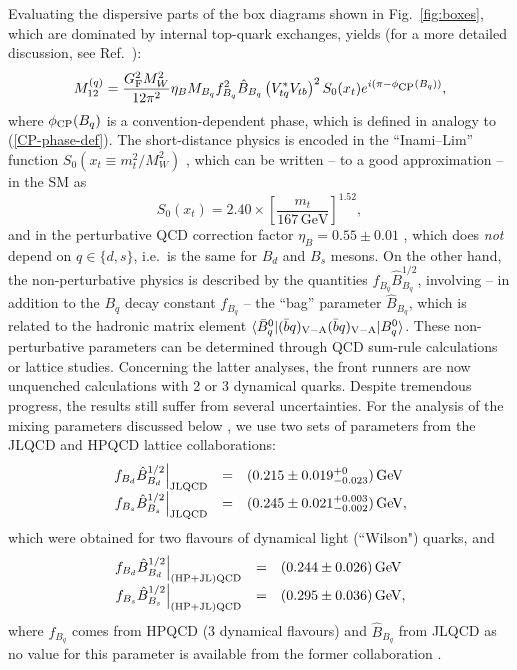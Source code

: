 \documentclass[12pt]{article}
\begin{document}
Evaluating the dispersive parts of the box diagrams shown in
Fig.~\ref{fig:boxes}, which are dominated by internal top-quark 
exchanges, yields (for a more detailed discussion, see Ref.~\cite{BF-rev}):
\begin{equation}\label{M12-calc}
M_{12}^{(q)}=
\frac{G_{\rm F}^2 M_{W}^{2}}{12\pi^{2}}
\eta_B M_{B_q}f_{B_q}^{2}\hat B_{B_q}\left(V_{tq}^\ast V_{tb}\right)^2 
S_0(x_{t}) e^{i(\pi-\phi_{\mbox{{\scriptsize CP}}}(B_q))},
\end{equation}
where $\phi_{\mbox{{\scriptsize CP}}}(B_q)$ is a convention-dependent
phase, which is defined in analogy to (\ref{CP-phase-def}).
The short-distance physics is encoded in the ``Inami--Lim'' function 
$S_0(x_{t}\equiv m_t^2/M_W^2)$ \cite{IL}, which can be written -- to a good 
approximation -- in the SM  as \cite{Buras-Schladming}
\begin{equation}
S_0(x_t)=2.40\times\left[\frac{m_t}{167\,\mbox{GeV}}\right]^{1.52},
\end{equation}
and in the perturbative QCD correction factor  $\eta_B=0.55\pm0.01$ \cite{eta-B},
which does {\it not} depend on $q\in\{d,s\}$, i.e.\ is the same for $B_d$ and $B_s$ 
mesons. On the other hand, the non-perturbative physics is described by the 
quantities $f_{B_q}\hat B_{B_q}^{1/2}$, involving -- in addition to the $B_q$ decay 
constant $f_{B_q}$ -- the ``bag'' parameter $\hat B_{B_q}$, which is related to the hadronic matrix element $\langle \bar B^0_q|(\bar bq)_{{\rm V}-{\rm A}}
(\bar bq)_{{\rm V}-{\rm A}}|B^0_q\rangle$. These non-perturbative parameters
can be determined through QCD sum-rule calculations \cite{SR-calc}
or lattice studies. Concerning the latter analyses, the front runners are 
now unquenched calculations with 2 or 3 dynamical quarks. 
Despite tremendous progress, the results still suffer from several uncertainties. For the
analysis of the mixing parameters discussed below \cite{BF-DMs}, we use 
two sets of parameters from the JLQCD \cite{JLQCD} and 
HPQCD \cite{HPQCD} lattice collaborations:
\begin{equation}\label{JLQCD}
\begin{array}{rcl}
\left.f_{B_d}\hat{B}_{B_d}^{1/2}\right|_{\rm JLQCD} &=& (0.215\pm
0.019^{+0}_{-0.023})\,{\rm GeV}\\
\left.f_{B_s}\hat{B}_{B_s}^{1/2}\right|_{\rm JLQCD} &=& (0.245\pm
0.021^{+0.003}_{-0.002})\,{\rm GeV},
\end{array}
\end{equation}
which were obtained for two flavours of dynamical light (``Wilson") quarks, and
\begin{equation}\label{HPQCD}
\begin{array}{rcl}
\left.f_{B_d}\hat{B}_{B_d}^{1/2}\right|_{\rm (HP+JL)QCD}& =& (0.244\pm
0.026)\,{\rm GeV}\\
\left.f_{B_s}\hat{B}_{B_s}^{1/2}\right|_{\rm (HP+JL)QCD} &=&
(0.295\pm0.036)\,{\rm GeV},
\end{array}
\end{equation}
where $f_{B_q}$ comes from HPQCD (3 dynamical
flavours) and $\hat B_{B_q}$ from JLQCD as no value for this parameter
is available from the former collaboration \cite{Okamoto}. 
\end{document}
